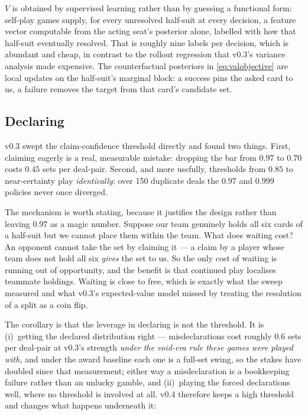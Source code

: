 \documentclass[11pt,letterpaper]{article}
\begin{document}
$V$ is obtained by supervised learning rather than by guessing a functional form:
self-play games supply, for every unresolved half-suit at every decision, a
feature vector computable from the acting seat's posterior alone, labelled with
how that half-suit eventually resolved. That is roughly nine labels per
decision, which is abundant and cheap, in contrast to the rollout regression
that v0.3's variance analysis made expensive. The counterfactual posteriors in
\eqref{eq:valobjective} are local updates on the half-suit's marginal block: a
success pins the asked card to us, a failure removes the target from that card's
candidate set.

\subsection{Declaring}
\label{sec:claiming}

v0.3 swept the claim-confidence threshold directly and found two things. First,
claiming eagerly is a real, measurable mistake: dropping the bar from $0.97$ to
$0.70$ costs $0.45$ sets per deal-pair. Second, and more usefully, thresholds
from $0.85$ to near-certainty play \emph{identically}: over 150 duplicate deals
the $0.97$ and $0.999$ policies never once diverged.

The mechanism is worth stating, because it justifies the design rather than
leaving $0.97$ as a magic number. Suppose our team genuinely holds all six cards
of a half-suit but we cannot place them within the team. What does waiting cost?
An opponent cannot take the set by claiming it --- a claim by a player whose team
does not hold all six \emph{gives} the set to us. So the only cost of waiting is
running out of opportunity, and the benefit is that continued play localises
teammate holdings. Waiting is close to free, which is exactly what the sweep
measured and what v0.3's expected-value model missed by treating the resolution
of a split as a coin flip.

The corollary is that the leverage in declaring is not the threshold. It is
(i)~getting the declared distribution right --- misdeclarations cost roughly
$0.6$ sets per deal-pair at v0.3's strength \emph{under the void-era rule
these games were played with}, and under the award baseline each one is a
full-set swing, so the stakes have doubled since that measurement; either
way a misdeclaration is a bookkeeping failure rather than an unlucky gamble,
and (ii)~playing the forced declarations well, where no threshold is
involved at all. v0.4 therefore keeps a high threshold and changes what
happens underneath it:
\end{document}
